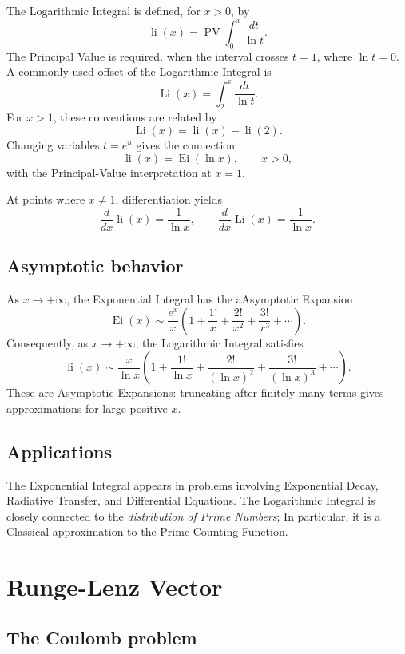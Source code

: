 \documentclass[a4paper, 10pt, onepage]{elegantbook}
\begin{document}
The Logarithmic Integral is defined, for \(x>0\), by
\[
\operatorname{li}(x)
=\operatorname{PV}\int_0^x \frac{dt}{\ln t}.
\]
The Principal Value is required. when the interval crosses \(t=1\),
where \(\ln t=0\). A commonly used offset of the Logarithmic Integral is
\[
\operatorname{Li}(x)
=\int_2^x \frac{dt}{\ln t}.
\]
For \(x>1\), these conventions are related by
\[
\operatorname{Li}(x)=\operatorname{li}(x)-\operatorname{li}(2).
\]
Changing variables \(t=e^u\) gives the connection
\[
\operatorname{li}(x)=\operatorname{Ei}(\ln x),
\qquad x>0,
\]
with the Principal-Value interpretation at \(x=1\).

At points where \(x\ne 1\), differentiation yields
\[
\frac{d}{dx}\operatorname{li}(x)=\frac{1}{\ln x},
\qquad
\frac{d}{dx}\operatorname{Li}(x)=\frac{1}{\ln x}.
\]

\subsection{Asymptotic behavior}

As \(x\to+\infty\), the Exponential Integral has the aAsymptotic Expansion
\[
\operatorname{Ei}(x)
\sim \frac{e^x}{x}
\left(
1+\frac{1!}{x}+\frac{2!}{x^2}
+\frac{3!}{x^3}+\cdots
\right).
\]
Consequently, as \(x\to+\infty\), the Logarithmic Integral satisfies
\[
\operatorname{li}(x)
\sim \frac{x}{\ln x}
\left(
1+\frac{1!}{\ln x}+\frac{2!}{(\ln x)^2}
+\frac{3!}{(\ln x)^3}+\cdots
\right).
\]
These are Asymptotic Expansions: truncating after finitely many terms gives approximations for large positive \(x\).

\subsection{Applications}

The Exponential Integral appears in problems involving Exponential Decay, Radiative Transfer, and Differential Equations. The Logarithmic Integral is closely connected to the \emph{distribution of Prime Numbers}; In particular, it is a Classical approximation to the Prime-Counting Function.

\section{Runge-Lenz Vector}

\subsection{The Coulomb problem}
\end{document}
